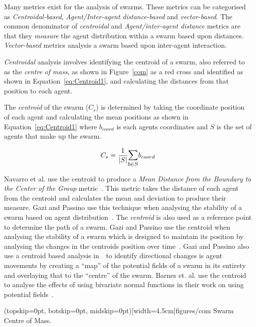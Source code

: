 \documentclass{ieeeaccess}
\newcommand{\card}[1]{\vert{#1}\vert}
\begin{document}
Many metrics exist for the analysis of swarms. These metrics can be categorised as \textit{Centroidal-based}, \textit{Agent/Inter-agent distance-based} and \textit{vector-based}. The common denominator of \textit{centroidal} and \textit{Agent/inter-agent distance} metrics are that they \textit{measure} the agent distribution within a swarm based upon distances. \textit{Vector-based} metrics analysis a swarm based upon inter-agent interaction. 

\textit{Centroidal} analysis involves identifying the centroid of a swarm, also referred to as the \textit{centre of mass}, as shown in Figure~\ref{com} as a red cross and identified as shown in Equation~\ref{eq:Centroid1}, and calculating the distances from that position to each agent. 

The \textit{centroid} of the swarm ($C_s$) is determined by taking the coordinate position of each agent and calculating the mean positions as shown in Equation~\ref{eq:Centroid1} where $b_{coord}$ is each agents coordinates and $S$ is the set of agents that make up the swarm.

\begin{equation}\label{eq:Centroid1}
C_s = \frac{1}{\card{S}}\mathlarger{\sum_{b \in S}} b_{coord}
\end{equation}

 Navarro et al. use the centroid to produce a \textit{Mean Distance from the Boundary to the Center of the Group} metric~\cite{NIM:09}. This metric takes the distance of each agent from the centroid and calculates the mean and deviation to produce their measure. Gazi and Passino use this technique when analysing the stability of a swarm based on agent distribution~\cite{GP:11}. The \textit{centroid} is also used as a reference point to determine the path of a swarm. Gazi and Passino use the centroid when analysing the stability of a swarm which is designed to maintain its position by analysing the changes in the centroids position over time~\cite{GP:04}. Gazi and Passino also use a centroid based analysis in~\cite{GP:02}~to identify directional changes is agent movements by creating a ``map'' of the potential fields of a swarm in its entirety and overlaying that to the ``centre'' of the swarm.  Barnes et. al. use the centroid to analyse the effects of using bivariate normal functions in their work on using potential fields~\cite{BAF:06, BAFVM:06}. 

\Figure[t!](topskip=0pt, botskip=0pt, midskip=0pt)[width=4.5cm]{figures/com}
{Swarm Centre of Mass.\label{com}}
\end{document}
